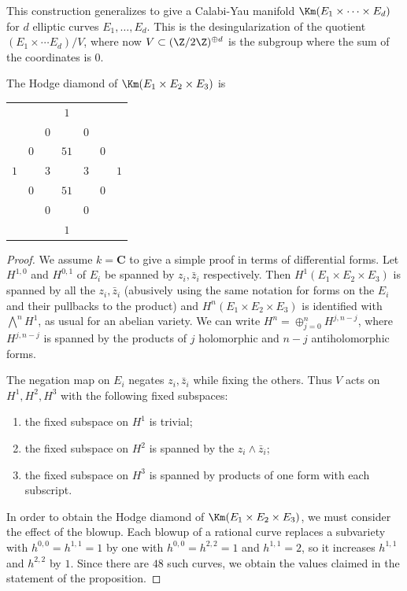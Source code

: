 \documentclass{article}
\begin{document}
\begin{rmk} This construction generalizes to give a Calabi-Yau manifold $\Km(E_1\times\cdots\times E_d)$ for $d$ elliptic curves $E_1,\dots,E_d$.  This is the desingularization of the quotient $(E_1\times \cdots E_d)/V$, where now $V\subset (\Z/2\Z)^{\oplus d}$ is the subgroup where the sum of the coordinates is 0.
\end{rmk} 

\begin{prop} The Hodge diamond of $\Km(E_1\times E_2\times E_3)$ is 
\begin{center}
\begin{tabular}{ccccccc}
&&&$1$&&&\\
&&$0$&&$0$&&\\
&$0$&&$51$&&$0$&\\
$1$&&$3$&&$3$&&$1$\\
&$0$&&$51$&&$0$&\\
&&$0$&&$0$&&\\
&&&$1$&&&
\end{tabular}
\end{center}
\end{prop}

\begin{proof} We assume $k=\mathbf{C}$ to give a simple proof in terms of differential forms.
Let $H^{1,0}$ and $H^{0,1}$ of $E_i$ be spanned by $z_i, \bar z_i$ respectively.
Then $H^1(E_1 \times E_2 \times E_3)$ is spanned by all the $z_i, \bar z_i$
(abusively using the same notation for forms on the $E_i$ and their pullbacks
to the product) and $H^n(E_1 \times E_2 \times E_3)$ is identified with
$\bigwedge^n H^1$, as usual for an abelian variety.  We can write
$H^n = \oplus_{j=0}^n H^{j,n-j}$, where $H^{j,n-j}$ is spanned by the products
of $j$ holomorphic and $n-j$ antiholomorphic forms.

The negation map on $E_i$ negates $z_i, \bar z_i$ while fixing
the others.  Thus $V$ acts on $H^1, H^2, H^3$ with the following fixed
subspaces:
\begin{enumerate}
\item the fixed subspace on $H^1$ is trivial;
\item the fixed subspace on $H^2$ is spanned by the $z_i \wedge \bar z_i$;
\item the fixed subspace on $H^3$ is spanned by products of one form with
  each subscript.
\end{enumerate}
In order to obtain the Hodge diamond of $\Km(E_1\times E_2\times E_3)$, we must consider the
effect of the blowup.  Each blowup of a rational curve replaces a subvariety
with $h^{0,0} = h^{1,1} = 1$ by one with $h^{0,0} = h^{2,2} = 1$ and $h^{1,1} = 2$,
so it increases $h^{1,1}$ and $h^{2,2}$ by $1$.  Since there are $48$ such
curves, we obtain the values claimed in the statement of the proposition.
\end{proof}
\end{document}
